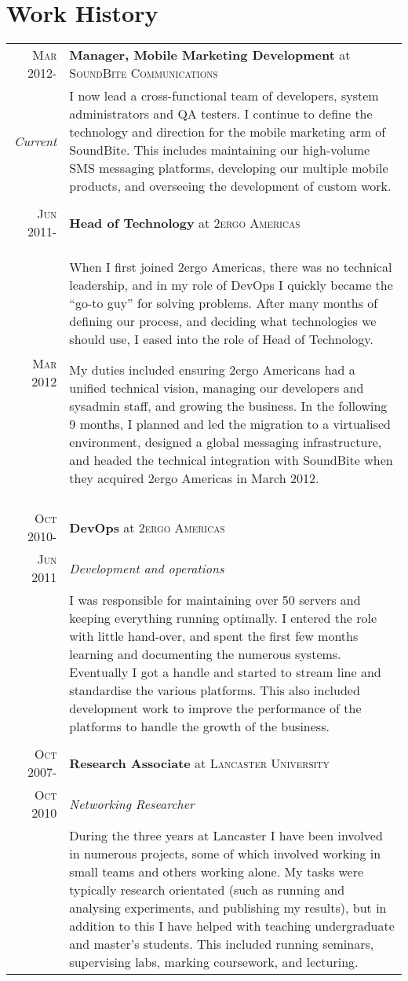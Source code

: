 \documentclass[letterpaper,10pt]{article}
\begin{document}
\section{Work History}
\begin{tabularx}{\textwidth}{r|X}

 \textsc{Mar 2012-} & \textbf{Manager, Mobile Marketing Development} at \textsc{SoundBite Communications} \\
 \emph{Current}     & I now lead a cross-functional team of developers, system administrators and QA testers. I continue to define
			the technology and direction for the mobile marketing arm of SoundBite. This includes maintaining our high-volume
			SMS messaging platforms, developing our multiple mobile products, and overseeing the development of custom work.\\
&\\
 \textsc{Jun 2011-} & \textbf{Head of Technology} at \textsc{2ergo Americas} \\
 \textsc{Mar 2012}  & When I first joined 2ergo Americas, there was no technical leadership, and in my role of DevOps
			I quickly became the ``go-to guy'' for solving problems. After many months of defining our process, and
			deciding what technologies we should use, I eased into the role of Head of Technology.

                        My duties included ensuring 
			2ergo Americans had a unified technical vision, managing our developers and sysadmin staff, and growing the business.
			In the following 9 months, I planned and led the migration to a virtualised environment, designed a global messaging
			infrastructure, and headed the technical integration with SoundBite when they acquired 2ergo Americas in March 2012. \\
&\\
 \textsc{Oct 2010-} & \textbf{DevOps} at \textsc{2ergo Americas} \\
 \textsc{Jun 2011}  & \emph{Development and operations}\\
                    & I was responsible for maintaining over 50 servers and keeping everything running optimally. 
			I entered the role with little hand-over, and spent the first few months learning and documenting the numerous systems.
			Eventually I got a handle and started to stream line and standardise the various platforms. This also included 
			development work to improve the performance of the platforms to handle the growth of the business. \\
&\\
 \textsc{Oct 2007-} & \textbf{Research Associate} at \textsc{Lancaster University} \\
 \textsc{Oct 2010}  & \emph{Networking Researcher}\\
                    & During the three years at Lancaster I have been involved in numerous projects, some of which involved working in small teams and
			others working alone. My tasks were typically research orientated (such as running and analysing experiments, and publishing my 
			results), but in addition to this I have helped with teaching undergraduate and master's students. This included running seminars,
			supervising labs, marking coursework, and lecturing.


\end{tabularx}
\end{document}
